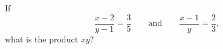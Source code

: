 If
\[\dfrac{x-2}{y-1}=\dfrac35\qquad\text{and}\qquad\dfrac{x-1}{y}=\dfrac23,\]
what is the product $xy$?
